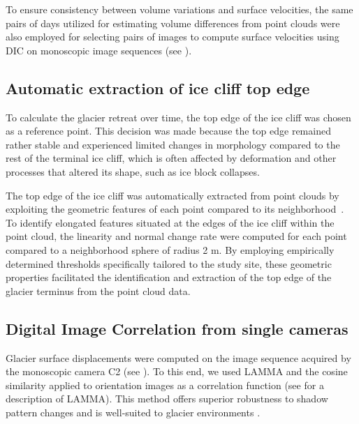 To ensure consistency between volume variations and surface velocities, the same pairs of days utilized for estimating volume differences from point clouds were also employed for selecting pairs of images to compute surface velocities using DIC on monoscopic image sequences (see ).

\subsection{Automatic extraction of ice cliff top edge}
\label{sec:4:topedge}
To calculate the glacier retreat over time, the top edge of the ice cliff was chosen as a reference point.
This decision was made because the top edge remained rather stable and experienced limited changes in morphology compared to the rest of the terminal ice cliff, which is often affected by deformation and other processes that altered its shape, such as ice block collapses.

The top edge of the ice cliff was automatically extracted from point clouds by exploiting the geometric features of each point compared to its neighborhood~\citep{Hackel2016}.
To identify elongated features situated at the edges of the ice cliff within the point cloud, the linearity and normal change rate were computed for each point compared to a neighborhood sphere of radius 2 m. By employing empirically determined thresholds specifically tailored to the study site, these geometric properties facilitated the
identification and extraction of the top edge of the glacier terminus from the point cloud data.

\subsection{Digital Image Correlation from single cameras}
\label{sec:4:dic}

Glacier surface displacements were computed on the image sequence acquired by the monoscopic camera C2 (see ).
To this end, we used LAMMA \citep{Dematteis2022} and the cosine similarity applied to orientation images as a correlation function (see  for a description of LAMMA).
This method offers superior robustness to shadow pattern changes and is well-suited to glacier environments \citep{Heid2012_evaluation_xcorr}.


